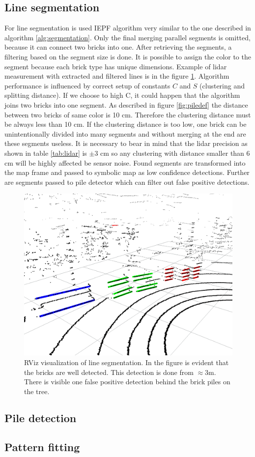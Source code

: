 \subsection{Line segmentation}
For line segmentation is used IEPF algorithm very similar to the one described in algorithm \ref{alg:segmentation}. Only the final merging parallel segments is omitted, because it can connect two bricks into one. After retrieving the segments, a filtering based on the segment size is done. It is possible to assign the color to the segment because each brick type has unique dimensions. Example of lidar measurement with extracted and filtered lines is in the figure \ref{fig:segments}. Algorithm performance is influenced by correct setup of constants $C$ and $S$ (clustering and splitting distance). If we choose to high C, it could happen that the algorithm joins two bricks into one segment. As described in figure \ref{fig:piledef} the distance between two bricks of same color is 10 cm. Therefore the clustering distance must be always less than 10 cm. If the clustering distance is too low, one brick can be unintentionally divided into many segments and without merging at the end are these segments useless. It is necessary to bear in mind that the lidar precision as shown in table \ref{tab:lidar} is $\pm3$ cm so any clustering with distance smaller than 6 cm will be highly affected be sensor noise. Found segments are transformed into the map frame and passed to symbolic map as low confidence detections. Further are segments passed to pile detector which can filter out false positive detections.

\hspace{8mm}

\begin{figure}[H]
\centering
\includegraphics[scale=0.43]{fig/segments}
\caption[Line segmentation visualization]{RViz visualization of line segmentation. In the figure is evident that the bricks are well detected. This detection is done from $\approx3$m. There is visible one false positive detection behind the brick piles on the tree.}
\label{fig:segments}
\end{figure}


\subsection{Pile detection}

\subsection{Pattern fitting}
